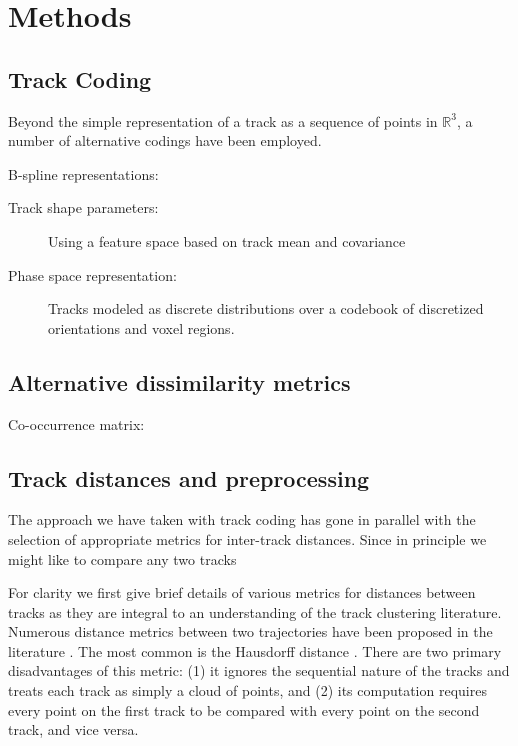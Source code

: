 \documentclass[preprint,authoryear,a4paper,10pt,onecolumn]{elsarticle}
\begin{document}
\section{Methods}

\subsection{\label{sub:track-coding}Track Coding}

Beyond the simple representation of a track as a sequence of points in
$\mathbb{R}^3$, a number of alternative codings have been employed.

\begin{description}

\item[B-spline representations:] \citep{Maddah_MICCA2005,
    maddah2006statistical, Maddah_IEEEBI2008}

\item[Track shape parameters:] Using a feature space based on track mean
  and covariance \citep{brun2004clustering}

\item[Phase space representation:] Tracks modeled as discrete
distributions over a codebook of discretized orientations and voxel \citep{wang2010tractography}
regions.

\end{description}

\subsection{Alternative dissimilarity metrics}

Co-occurrence matrix: \citep{jonasson2005fiber}

\subsection{\label{sub:track-distances}Track distances and preprocessing}

The approach we have taken with track coding has gone in parallel with
the selection of appropriate metrics for inter-track distances. Since in
principle we might like to compare any two tracks

For clarity we first give brief details of various metrics for distances
between tracks as they are integral to an understanding of the track
clustering literature. Numerous distance metrics between two
trajectories have been proposed in the literature \citep{Ding2003,
  MaddahIPMI2007, zhang2005dti}. The most common is the Hausdorff
distance \citep[and many other studies]{corouge2004towards}. There are
two primary disadvantages of this metric: (1) it ignores the sequential
nature of the tracks and treats each track as simply a cloud of points,
and (2) its computation requires every point on the first track to be
compared with every point on the second track, and vice versa.
\end{document}
